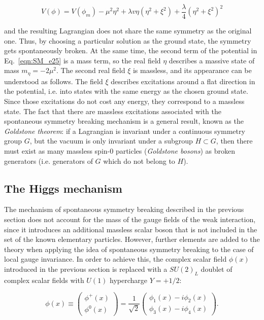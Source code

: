 \begin{equation}\label{eqn:SM_e25}
V(\phi) = V(\phi_m) - \mu^2\eta^2 + \lambda v\eta(\eta^2+\xi^2) + \frac{\lambda}{4}(\eta^2+\xi^2)^2
\end{equation}

\noindent and the resulting Lagrangian does not share the same symmetry as the original one. Thus, by choosing a particular solution as the ground state, the symmetry gets spontaneously broken.
At the same time, the second term of the potential in Eq.~\ref{eqn:SM_e25} is a mass term, so the real field $\eta$ describes a massive state of mass $m_\eta = -2\mu^2$.
The second real field $\xi$ is massless, and its appearance can be understood as follows.
The field $\xi$ describes excitations around a flat direction in the potential, i.e. into states with the same energy as the chosen ground state.
Since those excitations do not cost any energy, they correspond to a massless state.
The fact that there are massless excitations associated with the spontaneous symmetry breaking mechanism is a general result, known as the \textit{Goldstone theorem}:
if a Lagrangian is invariant under a continuous symmetry group $G$, but the vacuum is only invariant under a subgroup $H \subset G$,
then there must exist as many massless spin-0 particles (\textit{Goldstone bosons}) as broken generators (i.e. generators of $G$ which do not belong to $H$).\\

\subsection{The Higgs mechanism}\label{subsec:HiggsMech}

The mechanism of spontaneous symmetry breaking described in the previous section does not account for the mass of the gauge fields of the weak interaction,
since it introduces an additional massless scalar boson that is not included in the set of the known elementary particles.
However, further elements are added to the theory  when applying the idea of spontaneous symmetry breaking to the case of local gauge invariance.
In order to achieve this, the complex scalar field $\phi(x)$ introduced in the previous section is replaced with a $SU(2)_L$ doublet of complex scalar fields with $U(1)$ hypercharge $Y = +1/2$:

\begin{equation}\label{eqn:SM_e26}
\phi(x) \equiv
\begin{pmatrix}
  \phi^+(x) \\ \phi^0(x)
\end{pmatrix}
= \frac{1}{\sqrt{2}}
\begin{pmatrix}
  \phi_1(x) - i\phi_2(x) \\ \phi_3(x) - i\phi_4(x)
\end{pmatrix}.
\end{equation}


